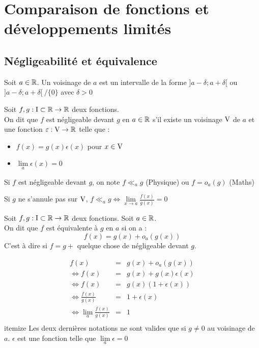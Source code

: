 \chapter{Comparaison de fonctions et développements limités}
\section{Négligeabilité  et équivalence}

Soit $a\in\mathbb{R}$. Un voisinage de $a$ est un intervalle de la forme $]a-\delta;a+\delta[$ ou $]a-\delta;a+\delta[~/\{0\}$ avec $\delta>0$

Soit $f,g:\text{I}\subset\mathbb{R} \to \mathbb{R}$ deux fonctions.\\
On dit que $f$ est négligeable devant $g$ en $a\in\mathbb{R}$ s'il existe un voisinage $\text{V}$ de $a$ et une fonction $\varepsilon:\text{V}\to\mathbb{R}$ telle que :
\begin{itemize}
	\item $f(x) = g(x)\epsilon (x)$ pour $x\in \text{V}$
	\item $\lim\limits_{a}\epsilon(x)=0$
\end{itemize}

\nota
Si $f$ est négligeable devant $g$, on note $f \ll_{a}g$ (Physique) ou $f=o_a(g)$ (Maths)

\rem
Si $g$ ne s'annule pas sur $\text{V}$, $f \ll_a g \Leftrightarrow \lim\limits_{x\to a}\frac{f(x)}{g(x)}=0$

\expl


Soit $f,g:\text{I}\subset\mathbb{R} \to \mathbb{R}$ deux fonctions. Soit $a\in\mathbb{R}$.\\
On dit que $f$ est équivalente à $g$ en $a$ si on a :
$$f(x) = g(x) + o_a(g(x))$$
C'est à dire si $f=g+$ quelque chose de négligeable devant $g$.

\rem
\begin{eqnarray*}
		f(x) &=& g(x) + o_a(g(x))\\
		\Leftrightarrow f(x) & = & g(x) + g(x)\epsilon(x)\\
		\Leftrightarrow f(x) & = & g(x)(1+\epsilon(x))\\
		\Leftrightarrow \frac{f(x)}{g(x)} &=& 1 + \epsilon(x)\\
		\Leftrightarrow \lim\limits_a\frac{f(x)}{g(x)} &=& 1\\
\end{eqnarray*}itemize
Les deux dernières notations ne sont valides que si $g\neq 0$ au voisinage de $a$. $\epsilon$ est une fonction telle que $\lim\limits_a\epsilon=0$ 

